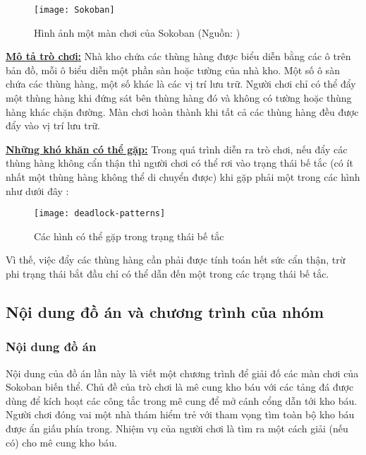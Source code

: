 \begin{figure}[htp!]
	\centering
	\texttt{[image: Sokoban]}
	\caption[Hình ảnh một màn chơi của Sokoban]{Hình ảnh một màn chơi của Sokoban (Nguồn: )}
\end{figure}

\underline{\textbf{Mô tả trò chơi:}} Nhà kho chứa các thùng hàng được biểu diễn bằng các ô trên bản đồ, mỗi ô biểu diễn một phần sàn hoặc tường của nhà kho. Một số ô sàn chứa các thùng hàng, một số khác là các vị trí lưu trữ. Người chơi chỉ có thể đẩy một thùng hàng khi đứng sát bên thùng hàng đó và không có tường hoặc thùng hàng khác chặn đường. \linebreak Màn chơi hoàn thành khi tất cả các thùng hàng đều được đẩy vào vị trí lưu trữ.

\underline{\textbf{Những khó khăn có thể gặp:}} Trong quá trình diễn ra trò chơi, nếu đẩy các thùng hàng không cẩn thận thì người chơi có thể rơi vào trạng thái bế tắc (có ít nhất một thùng hàng không thể di chuyển được) khi gặp phải một trong các hình như dưới đây \cite{timo-sokoban}:


\begin{figure}[htp!]
	\centering
	\texttt{[image: deadlock-patterns]}
	\caption{Các hình có thể gặp trong trạng thái bế tắc}
	\label{fig:deadlocks}
\end{figure}

Vì thế, việc đẩy các thùng hàng cần phải được tính toán hết sức cẩn thận, trừ phi trạng thái bắt đầu chỉ có thể dẫn đến một trong các trạng thái bế tắc.

\subsection{Nội dung đồ án và chương trình của nhóm}

\subsubsection{Nội dung đồ án}
Nội dung của đồ án lần này là viết một chương trình để giải đố các màn chơi của Sokoban biến thể. Chủ đề của trò chơi là mê cung kho báu với các tảng đá được dùng để kích hoạt các công tắc trong mê cung để mở cánh cổng dẫn tới kho báu. Người chơi đóng vai một nhà thám hiểm trẻ với tham vọng tìm toàn bộ kho báu được ẩn giấu phía trong. Nhiệm vụ của người chơi là tìm ra một cách giải (nếu có) cho mê cung kho báu.

